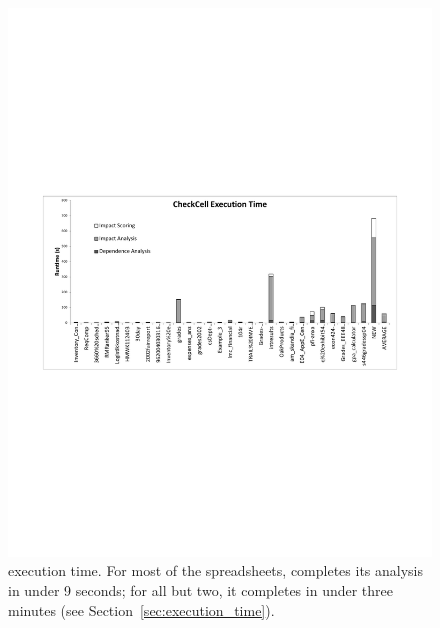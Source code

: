 \begin{figure}[!t]
\centering
\includegraphics[width=5.5in]{execution_time_graph}
  \caption{\checkcell{} execution time. For most of the spreadsheets, \checkcell{} completes its analysis in under 9 seconds; for all but two, it completes in under three minutes (see Section~\ref{sec:execution_time}).\label{fig:execution_time_graph}}
\end{figure}
 

